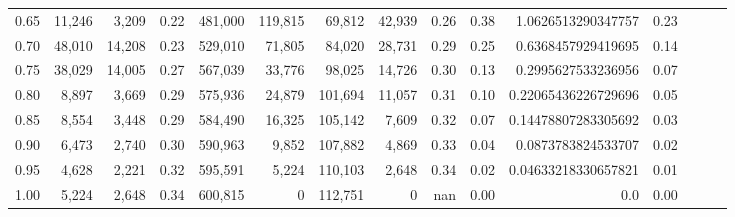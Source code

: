 \begin{tabular}{rrrrrrrrrrrrrrr}
0.65 &  11,246 &   3,209 &  0.22 &  481,000 &  119,815 &   69,812 &   42,939 &  0.26 &  0.38 &   1.0626513290347757 &      0.23 \\
0.70 &  48,010 &  14,208 &  0.23 &  529,010 &   71,805 &   84,020 &   28,731 &  0.29 &  0.25 &   0.6368457929419695 &      0.14 \\
0.75 &  38,029 &  14,005 &  0.27 &  567,039 &   33,776 &   98,025 &   14,726 &  0.30 &  0.13 &   0.2995627533236956 &      0.07 \\
0.80 &   8,897 &   3,669 &  0.29 &  575,936 &   24,879 &  101,694 &   11,057 &  0.31 &  0.10 &  0.22065436226729696 &      0.05 \\
0.85 &   8,554 &   3,448 &  0.29 &  584,490 &   16,325 &  105,142 &    7,609 &  0.32 &  0.07 &  0.14478807283305692 &      0.03 \\
0.90 &   6,473 &   2,740 &  0.30 &  590,963 &    9,852 &  107,882 &    4,869 &  0.33 &  0.04 &   0.0873783824533707 &      0.02 \\
0.95 &   4,628 &   2,221 &  0.32 &  595,591 &    5,224 &  110,103 &    2,648 &  0.34 &  0.02 &  0.04633218330657821 &      0.01 \\
1.00 &   5,224 &   2,648 &  0.34 &  600,815 &        0 &  112,751 &        0 &   nan &  0.00 &                  0.0 &      0.00 \\
\bottomrule
\end{tabular}
